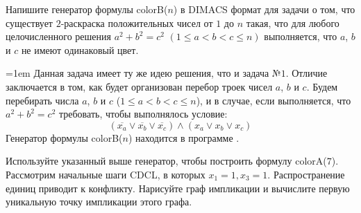 \documentclass[12pt]{extreport}
\theoremstyle{definiton}
\theoremstyle{definition}
\theoremstyle{definition}
\let\leq\leqslant
\newcommand{\solution}[2][\color{myblue}Решение]{
\medskip
	\noindent{\bfseries #1 }{{\color{myblue}\bfseries #2:}}
}
\newenvironment{blockquote}{%
  \par%
  \medskip
  \leftskip=1em%
  \noindent}{%
  \par\medskip}
\begin{document}
\Pr[10 баллов] Напишите генератор формулы colorB($n$) в DIMACS формат для задачи о том, что существует $2$-раскраска положительных чисел от $1$ до $n$ такая, что для любого целочисленного решения $a^2+b^2 =c^2$ $(1 \leq a < b < c \leq n)$ выполняется, что $a$, $b$ и $c$ не имеют одинаковый цвет.

\solution{2}
\begin{blockquote}
{\color{myblue}
\noindent Данная задача имеет ту же идею решения, что и задача №$1$.
Отличие заключается в том, как будет организован перебор троек чисел $a$, $b$ и $c$. Будем перебирать числа $a$, $b$ и $c$ ($1 \leq a < b < c \leq n$), и в случае, если выполняется, что $a^2 + b^2 = c^2$ требовать, чтобы выполнялось условие:
$$(\overline{x_a} \vee \overline{x_b} \vee \overline{x_c}) \wedge (x_a \vee x_b \vee x_c)$$
Генератор формулы colorB($n$) находится в программе {}.
}
\end{blockquote}

\Pr[10 баллов] Используйте указанный выше генератор, чтобы построить формулу colorA($7$). Рассмотрим начальные шаги CDCL, в которых $x_1 = 1, x_3 = 1$. Распространение единиц приводит к конфликту. Нарисуйте граф импликации и вычислите первую уникальную точку импликации этого графа.
\end{document}
